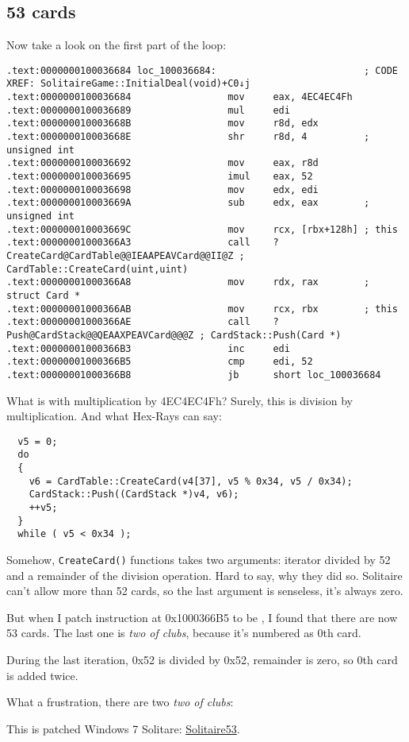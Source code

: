 \subsection{53 cards}

\renewcommand{\CURPATH}{examples/solitaire/53}

Now take a look on the first part of the loop:

\begin{lstlisting}
.text:0000000100036684 loc_100036684:                          ; CODE XREF: SolitaireGame::InitialDeal(void)+C0↓j
.text:0000000100036684                 mov     eax, 4EC4EC4Fh
.text:0000000100036689                 mul     edi
.text:000000010003668B                 mov     r8d, edx
.text:000000010003668E                 shr     r8d, 4          ; unsigned int
.text:0000000100036692                 mov     eax, r8d
.text:0000000100036695                 imul    eax, 52
.text:0000000100036698                 mov     edx, edi
.text:000000010003669A                 sub     edx, eax        ; unsigned int
.text:000000010003669C                 mov     rcx, [rbx+128h] ; this
.text:00000001000366A3                 call    ?CreateCard@CardTable@@IEAAPEAVCard@@II@Z ; CardTable::CreateCard(uint,uint)
.text:00000001000366A8                 mov     rdx, rax        ; struct Card *
.text:00000001000366AB                 mov     rcx, rbx        ; this
.text:00000001000366AE                 call    ?Push@CardStack@@QEAAXPEAVCard@@@Z ; CardStack::Push(Card *)
.text:00000001000366B3                 inc     edi
.text:00000001000366B5                 cmp     edi, 52
.text:00000001000366B8                 jb      short loc_100036684
\end{lstlisting}

What is with multiplication by 4EC4EC4Fh? Surely, this is division by multiplication.
And what Hex-Rays can say:

\begin{lstlisting}
  v5 = 0;
  do
  {
    v6 = CardTable::CreateCard(v4[37], v5 % 0x34, v5 / 0x34);
    CardStack::Push((CardStack *)v4, v6);
    ++v5;
  }
  while ( v5 < 0x34 );
\end{lstlisting}

Somehow, \verb|CreateCard()| functions takes two arguments: iterator divided by 52 and a remainder of the division operation.
Hard to say, why they did so.
Solitaire can't allow more than 52 cards, so the last argument is senseless, it's always zero.

But when I patch  instruction at 0x1000366B5 to be , I found that there are now 53 cards.
The last one is \textit{two of clubs}, because it's numbered as 0th card.

During the last iteration, 0x52 is divided by 0x52, remainder is zero, so 0th card is added twice.

What a frustration, there are two \textit{two of clubs}:

\begin{figure}[H]
\centering
{}
\end{figure}

This is patched Windows 7 Solitare:
\href{\RepoURL/examples/solitaire/53/Solitaire53.exe}{Solitaire53}.

